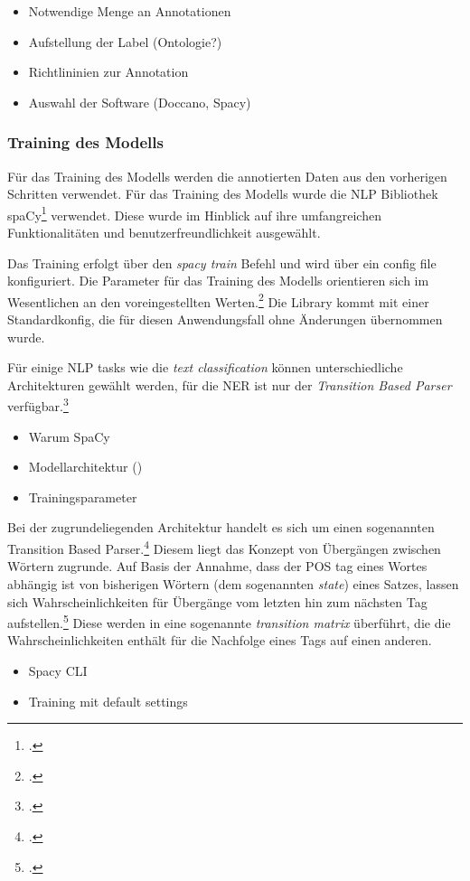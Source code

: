 
\begin{itemize}
    \item Notwendige Menge an Annotationen
    \item Aufstellung der Label (Ontologie?)
    \item Richtlininien zur Annotation
    \item Auswahl der Software (Doccano, Spacy)
\end{itemize}
\subsubsection{Training des Modells}
Für das Training des Modells werden die annotierten Daten aus den vorherigen Schritten verwendet.
Für das Training des Modells wurde die \acl{NLP} Bibliothek spaCy\footcite[]{spacy2} verwendet. Diese wurde im Hinblick auf ihre umfangreichen Funktionalitäten und benutzerfreundlichkeit ausgewählt.

Das Training erfolgt über den \textit{spacy train} Befehl und wird über ein config file konfiguriert. Die Parameter für das Training des Modells orientieren sich im Wesentlichen an den voreingestellten Werten.\footcite[vgl.]{ostkamp2021} Die Library kommt mit einer Standardkonfig, die für diesen Anwendungsfall ohne Änderungen übernommen wurde.

Für einige \ac{NLP} tasks wie die \textit{text classification} können unterschiedliche Architekturen gewählt werden, für die \acl*{NER} ist nur der \textit{Transition Based Parser} verfügbar.\footcite{zotero-182}

\begin{itemize}
    \item Warum SpaCy
    \item Modellarchitektur ()
    \item Trainingsparameter
\end{itemize}


Bei der zugrundeliegenden Architektur handelt es sich um einen sogenannten Transition Based Parser.\footcite{zotero-182} Diesem liegt das Konzept von Übergängen zwischen Wörtern zugrunde. Auf Basis der Annahme, dass der \acl*{POS} tag eines Wortes abhängig ist von bisherigen Wörtern (dem sogenannten \textit{state}) eines Satzes, lassen sich Wahrscheinlichkeiten für Übergänge vom letzten hin zum nächsten Tag aufstellen.\footcite{honnibal2013a} Diese werden in eine sogenannte \textit{transition matrix} überführt, die die Wahrscheinlichkeiten enthält für die Nachfolge eines Tags auf einen anderen.
\begin{itemize}
    \item Spacy CLI
    \item Training mit default settings
\end{itemize}

